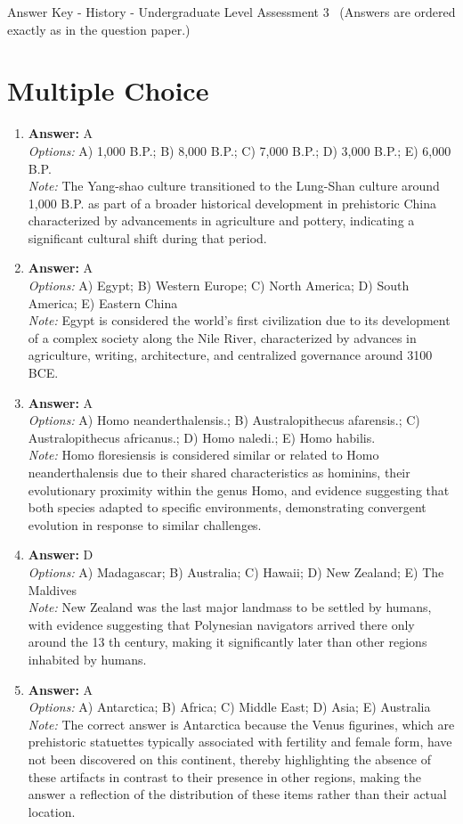 \documentclass[12pt]{article}
\begin{document}
\begin{center}
Answer Key - History - Undergraduate Level Assessment 3 \
\small (Answers are ordered exactly as in the question paper.)
\end{center}

\section*{Multiple Choice}
\begin{enumerate}[label=\arabic*.]
\item \textbf{Answer:} A
\\ \textit{Options:} A) 1,000 B.P.; B) 8,000 B.P.; C) 7,000 B.P.; D) 3,000 B.P.; E) 6,000 B.P.
\\ \textit{Note:} The Yang-shao culture transitioned to the Lung-Shan culture around 1,000 B.P. as part of a broader historical development in prehistoric China characterized by advancements in agriculture and pottery, indicating a significant cultural shift during that period.
\item \textbf{Answer:} A
\\ \textit{Options:} A) Egypt; B) Western Europe; C) North America; D) South America; E) Eastern China
\\ \textit{Note:} Egypt is considered the world's first civilization due to its development of a complex society along the Nile River, characterized by advances in agriculture, writing, architecture, and centralized governance around 3100 BCE.
\item \textbf{Answer:} A
\\ \textit{Options:} A) Homo neanderthalensis.; B) Australopithecus afarensis.; C) Australopithecus africanus.; D) Homo naledi.; E) Homo habilis.
\\ \textit{Note:} Homo floresiensis is considered similar or related to Homo neanderthalensis due to their shared characteristics as hominins, their evolutionary proximity within the genus Homo, and evidence suggesting that both species adapted to specific environments, demonstrating convergent evolution in response to similar challenges.
\item \textbf{Answer:} D
\\ \textit{Options:} A) Madagascar; B) Australia; C) Hawaii; D) New Zealand; E) The Maldives
\\ \textit{Note:} New Zealand was the last major landmass to be settled by humans, with evidence suggesting that Polynesian navigators arrived there only around the 13 th century, making it significantly later than other regions inhabited by humans.
\item \textbf{Answer:} A
\\ \textit{Options:} A) Antarctica; B) Africa; C) Middle East; D) Asia; E) Australia
\\ \textit{Note:} The correct answer is Antarctica because the Venus figurines, which are prehistoric statuettes typically associated with fertility and female form, have not been discovered on this continent, thereby highlighting the absence of these artifacts in contrast to their presence in other regions, making the answer a reflection of the distribution of these items rather than their actual location.
\end{enumerate}
\end{document}
